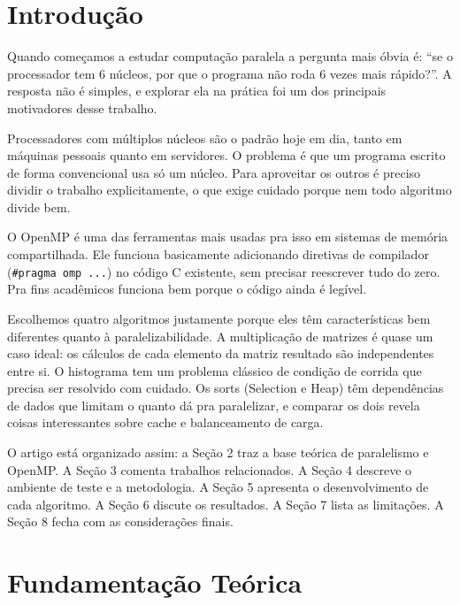 \documentclass[12pt]{article}
\begin{document}
\newpage
\tableofcontents
\newpage

\section{Introdução}

Quando começamos a estudar computação paralela a pergunta mais óbvia é: ``se o processador tem 6 núcleos, por que o programa não roda 6 vezes mais rápido?''. A resposta não é simples, e explorar ela na prática foi um dos principais motivadores desse trabalho.

Processadores com múltiplos núcleos são o padrão hoje em dia, tanto em máquinas pessoais quanto em servidores. O problema é que um programa escrito de forma convencional usa só um núcleo. Para aproveitar os outros é preciso dividir o trabalho explicitamente, o que exige cuidado porque nem todo algoritmo divide bem.

O OpenMP é uma das ferramentas mais usadas pra isso em sistemas de memória compartilhada. Ele funciona basicamente adicionando diretivas de compilador (\texttt{\#pragma omp ...}) no código C existente, sem precisar reescrever tudo do zero. Pra fins acadêmicos funciona bem porque o código ainda é legível.

Escolhemos quatro algoritmos justamente porque eles têm características bem diferentes quanto à paralelizabilidade. A multiplicação de matrizes é quase um caso ideal: os cálculos de cada elemento da matriz resultado são independentes entre si. O histograma tem um problema clássico de condição de corrida que precisa ser resolvido com cuidado. Os sorts (Selection e Heap) têm dependências de dados que limitam o quanto dá pra paralelizar, e comparar os dois revela coisas interessantes sobre cache e balanceamento de carga.

O artigo está organizado assim: a Seção 2 traz a base teórica de paralelismo e OpenMP. A Seção 3 comenta trabalhos relacionados. A Seção 4 descreve o ambiente de teste e a metodologia. A Seção 5 apresenta o desenvolvimento de cada algoritmo. A Seção 6 discute os resultados. A Seção 7 lista as limitações. A Seção 8 fecha com as considerações finais.

\section{Fundamentação Teórica}
\end{document}
